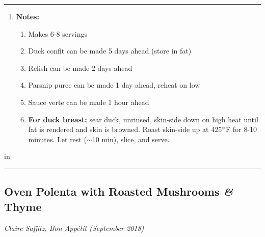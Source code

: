 \documentclass[10pt,a4paper]{article}
\begin{document}
{\begin{minipage}{0.66\linewidth}
\rule{\textwidth}{0.4pt}
\begin{enumerate}[]
    \item \textbf{Notes:}
    \begin{enumerate}[-]
        \item Makes 6-8 servings
        \item Duck confit can be made 5 days ahead (store in fat)
        \item Relish can be made 2 days ahead
        \item Parsnip puree can be made 1 day ahead, reheat on low
        \item Sauce verte can be made 1 hour ahead
        \item \textbf{For duck breast:} sear duck, unrinsed, skin-side down on high heat until fat is rendered and skin is browned. Roast skin-side up at 425$\degree$F for 8-10 minutes. Let rest ($\sim$10 min), slice, and serve.
    \end{enumerate}
\end{enumerate}
\end{minipage}}
 in
\rule{\textwidth}{0.4pt}
\vfill

\newpage

\subsection{Oven Polenta with Roasted Mushrooms \textit{\&} Thyme}
\textit{Claire Saffitz, Bon Appétit (September 2018)}
\end{document}
